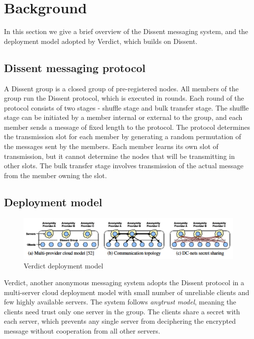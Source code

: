 \section{Background}
In this section we give a brief overview of the Dissent messaging system, and the deployment model adopted by Verdict, which builds on Dissent.

\subsection{Dissent messaging protocol}
A Dissent group is a closed group of pre-registered nodes. All members of the group run the Dissent protocol, which is executed in rounds. Each round of the protocol consists of two stages - shuffle stage and bulk transfer stage. The shuffle stage can be initiated by a member internal or external to the group, and each member sends a message of fixed length to the protocol. The protocol determines the transmission slot for each member by generating a random permutation of the messages sent by the members. Each member learns its own slot of transmission, but it cannot determine the nodes that will be transmitting in other slots. The bulk transfer stage involves transmission of the actual message from the member owning the slot. %

\subsection{Deployment model}
\begin{figure}
\centering
\includegraphics[width=0.7\linewidth]{dissent-model}
\caption{Verdict deployment model}
\label{fig:dissent-model}
\end{figure}

Verdict, another anonymous messaging system adopts the Dissent protocol in a multi-server cloud deployment model with small number of unreliable clients and few highly available servers. The system follows \emph{anytrust model}, meaning the clients need trust only one server in the group. The clients share a secret with each server, which prevents any single server from deciphering the encrypted message without cooperation from all other servers.


